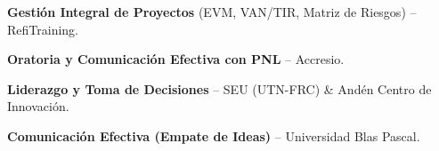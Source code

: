 
\begin{cvitems}
    \item \textbf{Gestión Integral de Proyectos} (EVM, VAN/TIR, Matriz de Riesgos) -- RefiTraining.
    \item \textbf{Oratoria y Comunicación Efectiva con PNL} -- Accresio.
    \item \textbf{Liderazgo y Toma de Decisiones} -- SEU (UTN-FRC) \& Andén Centro de Innovación.
    \item \textbf{Comunicación Efectiva (Empate de Ideas)} -- Universidad Blas Pascal.
\end{cvitems}
